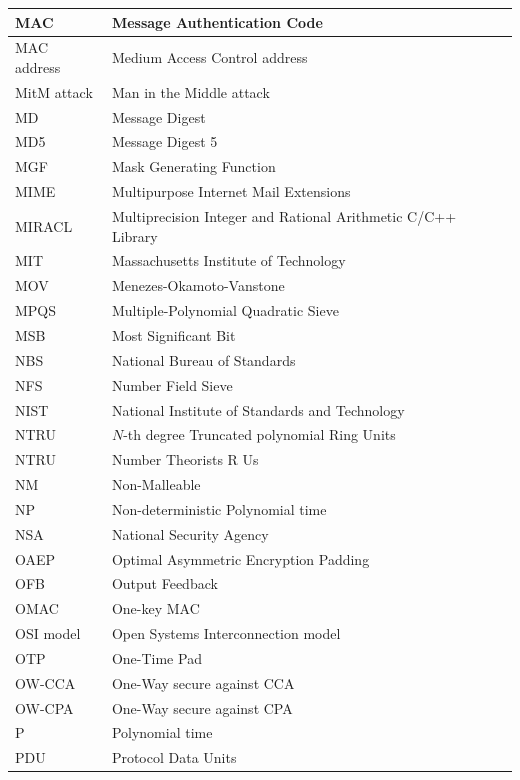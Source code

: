 \documentclass[a4paper, 12pt]{book} %
\begin{document}
\begin{longtable}{||lp{11cm}||}
    MAC & Message Authentication Code \\ \hline 
    MAC address & Medium Access Control address \\ \hline 
    MitM attack & Man in the Middle attack \\ \hline 
    MD & Message Digest \\ \hline 
    MD5 & Message Digest 5 \\ \hline 
    MGF & Mask Generating Function \\ \hline 
    MIME & Multipurpose Internet Mail Extensions \\ \hline 
    MIRACL & Multiprecision Integer and Rational Arithmetic \newline  C/C++ Library \\ \hline 
    MIT & Massachusetts Institute of Technology \\ \hline 
    MOV & Menezes-Okamoto-Vanstone \\ \hline 
    MPQS & Multiple-Polynomial Quadratic Sieve \\ \hline 
    MSB & Most Significant Bit \\ \hline 
    NBS & National Bureau of Standards \\ \hline 
    NFS & Number Field Sieve \\ \hline 
    NIST & National Institute of Standards and Technology \\ \hline 
    NTRU & $N$-th degree Truncated polynomial Ring Units \\ \hline 
    NTRU & Number Theorists R Us \\ \hline 
    NM & Non-Malleable \\ \hline 
    NP & Non-deterministic Polynomial time \\ \hline 
    NSA & National Security Agency \\ \hline 
    OAEP & Optimal Asymmetric Encryption Padding \\ \hline
    OFB & Output Feedback \\ \hline 
    OMAC & One-key MAC \\ \hline
    OSI model & Open Systems Interconnection model \\ \hline
    OTP & One-Time Pad \\ \hline  
    OW-CCA & One-Way secure against CCA \\ \hline 
    OW-CPA & One-Way secure against CPA \\ \hline 
    P & Polynomial time \\ \hline 
    PDU & Protocol Data Units \\ \hline 

\end{longtable}
\end{document}
